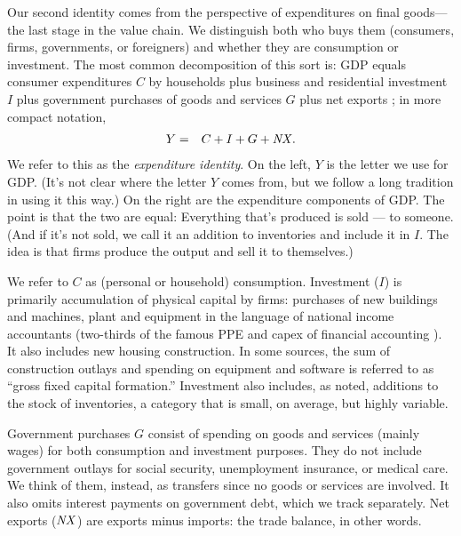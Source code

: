 Our second identity comes from the perspective of expenditures on final goods---the last stage in the value chain. We distinguish both who buys them (consumers, firms, governments, or foreigners)
and whether they are consumption or investment.
The most common decomposition
of this sort is: GDP equals consumer expenditures $C$ by households
plus business and residential investment $I$
plus government purchases of goods and services $G$
plus net exports \NX; in more compact notation,
\begin{eqnarray}
    Y &=& C+I+G+\mbox{\em NX\/} .
    \label{eq:exp-identity}
\end{eqnarray}
We refer to this as the {\it expenditure identity\/}.
On the left, $Y$ is the letter we use for GDP.
(It's not clear where the letter $Y$ comes from, but we follow a long tradition in using it this way.)
On the right are the expenditure components of GDP.
The point is that the two are equal:
Everything that's produced is sold --- to someone.
(And if it's not sold, we call it an addition to inventories
and include it in $I$.
The idea is that firms produce the output and sell it to themselves.)


We refer to $C$ as (personal or household) consumption.
Investment 
 ($I$) is primarily accumulation of physical capital  by firms:
purchases of new buildings and machines, plant and equipment in
the language of national income accountants (two-thirds of the
famous PPE and capex of financial accounting
). It also includes new housing construction.
In some sources, the sum of construction outlays and spending on equipment and software is referred to as ``gross fixed capital formation.''
Investment also includes, as noted, additions to the stock of inventories,
a category that is small, on average, but highly variable.


Government purchases
$G$ consist of spending on goods and
services (mainly wages) for both consumption and investment purposes.
They do not include government outlays
for social security, unemployment insurance, or medical care.
We think of them, instead, as transfers since no goods or
services are involved.
It also omits interest payments on government debt, which we track separately.
Net exports 
 ($\mbox{\em NX\/}$) are exports minus imports: the   trade balance, 
 in other words.

